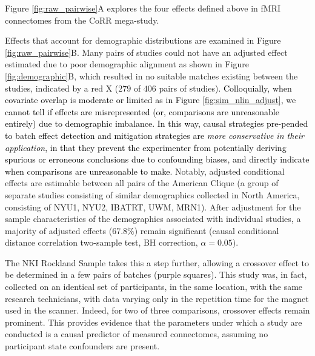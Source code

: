 Figure \ref{fig:raw_pairwise}A explores the four effects defined above in fMRI connectomes from the CoRR mega-study. {}

Effects that account for demographic distributions are examined in Figure \ref{fig:raw_pairwise}B. Many pairs of studies could not have an adjusted effect estimated due to poor demographic alignment as shown in Figure \ref{fig:demographic}B, which resulted in no suitable matches existing between the studies, indicated by a red X ($279$ of $406$ pairs of studies). \textcolor{black}{Colloquially, when covariate overlap is moderate or limited as in Figure \ref{fig:sim_nlin_adjust}, we cannot tell if effects are misrepresented (or, comparisons are unreasonable entirely) due to demographic imbalance. In this way, causal strategies pre-pended to batch effect detection and mitigation strategies are \textit{more conservative in their application}, in that they prevent the experimenter from potentially deriving spurious or erroneous conclusions due to confounding biases, and directly indicate when comparisons are unreasonable to make}. Notably, adjusted conditional effects are estimable between all pairs of the American Clique (a group of separate studies consisting of similar demographics collected in North America, consisting of NYU1, NYU2, IBATRT, UWM, MRN1). After adjustment for the sample characteristics of the demographics associated with individual studies, a majority of adjusted effects (67.8$\%$) remain significant (causal conditional distance correlation two-sample test, BH correction, $\alpha=0.05$). 

The NKI Rockland Sample takes this a step further, allowing a crossover effect to be determined in a few pairs of batches (purple squares). This study was, in fact, collected on an identical set of participants, in the same location, with the same research technicians, with data varying only in the repetition time for the magnet used in the scanner. Indeed, for two of three comparisons, crossover effects remain prominent. This provides evidence that the parameters under which a study are conducted is a causal predictor of measured connectomes, assuming no participant state confounders are present.

